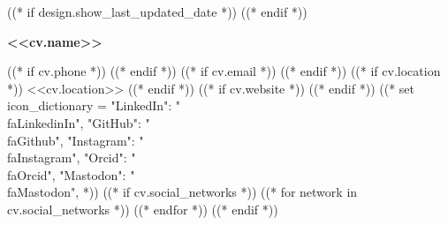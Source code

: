 ((* if design.show_last_updated_date *))
    \placelastupdatedtext
((* endif *))

\begin{header}
    \fontsize{<<design.header_font_size>>}{<<design.header_font_size>>}
    \textbf{<<cv.name>>}

    \vspace{<<design.margins.header.vertical_between_name_and_connections>>}

    \normalsize
((* if cv.phone *))
    \mbox{}
    \hspace{0.5cm}
((* endif *))
((* if cv.email *))
    \mbox{}
    \hspace{0.5cm}
((* endif *))
((* if cv.location *))
    \mbox{{\small\faMapMarker*}\hspace{0.13cm}<<cv.location>>}
    \hspace{0.5cm}
((* endif *))
((* if cv.website *))
    \mbox{}
    \hspace{0.5cm}
((* endif *))
((*
    set icon_dictionary = {
        "LinkedIn": "\\faLinkedinIn",
        "GitHub": "\\faGithub",
        "Instagram": "\\faInstagram",
        "Orcid": "\\faOrcid",
        "Mastodon": "\\faMastodon",
    }
*))
((* if cv.social_networks *))
    ((* for network in cv.social_networks *))
    \mbox{}
    \hspace{0.5cm}
    ((* endfor *))
((* endif *))
\end{header}

\vspace{<<design.margins.header.bottom>>}